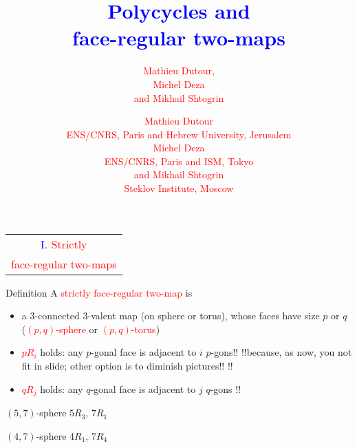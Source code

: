 \documentclass[%
pdf,
colorBG,
slideColor,
]{prosper}
\title{\Huge \textcolor{blue}{Polycycles and}\\[3mm]
\textcolor{blue}{face-regular two-maps}}
\author{
\textcolor{red}{\Large Mathieu Dutour,}\\[2mm]
\textcolor{red}{\Large Michel Deza}\\[2mm]
\textcolor{red}{\Large and Mikhail Shtogrin}\\
}
\author{
\textcolor{red}{\Large Mathieu Dutour}\\[2mm]
\textcolor{red}{\large ENS/CNRS, Paris and Hebrew University, Jerusalem}\\[2mm]
\textcolor{red}{\Large Michel Deza}\\[2mm]
\textcolor{red}{\large ENS/CNRS, Paris and ISM, Tokyo}\\[2mm]
\textcolor{red}{\Large and Mikhail Shtogrin}\\[2mm]
\textcolor{red}{\large Steklov Institute, Moscow}
}
\date{}
\begin{document}
\maketitle

















\begin{slide}{}
\begin{center}
{\Huge 
\begin{tabular*}{9cm}{c}
\\[-0.5cm]
\textcolor{blue}{I. }\textcolor{red}{Strictly}\\
\textcolor{red}{face-regular two-maps}
\end{tabular*}
}
\end{center}
\end{slide}




\begin{slide}{Definition}
\vspace{-3mm}
A \textcolor{red}{strictly face-regular two-map} is 
\begin{itemize}
\item a $3$-connected $3$-valent map (on sphere or torus), whose faces have size $p$ 
or $q$ (\textcolor{red}{$(p,q)$-sphere} or \textcolor{red}{$(p,q)$-torus})
\item \textcolor{red}{$pR_i$} holds: any $p$-gonal face is adjacent to $i$ 
$p$-gons!! 
!!because, as now, you not fit in slide; other option is to diminish 
pictures!!
!!%
\item \textcolor{red}{$qR_j$} holds: any $q$-gonal face is adjacent to $j$ 
$q$-gons 
!!%
\end{itemize}

\begin{center}
\begin{minipage}{4.7cm}
\centering
{}\par
$(5,7)$-sphere $5R_3$, $7R_1$
\end{minipage}
\begin{minipage}{4.7cm}
\centering
{}\par
$(4,7)$-sphere $4R_1$, $7R_4$
\end{minipage}

\end{center}
\end{slide}
\end{document}

